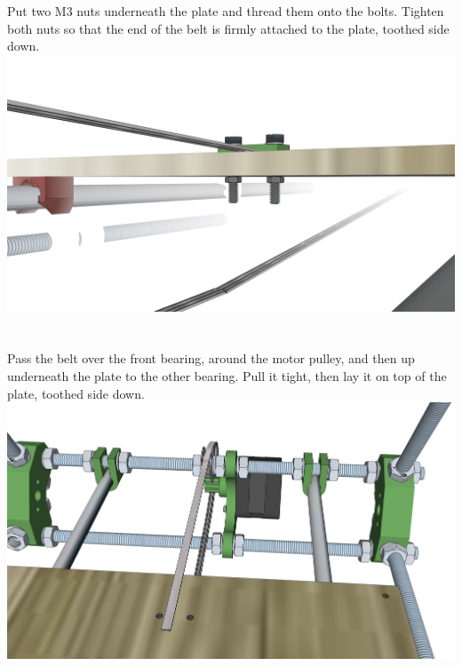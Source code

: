 \documentclass[twoside,a4paper,titlepage]{memoir}
\begin{document}
	\section{}
	Put two M3 nuts underneath the plate and thread them onto the bolts. Tighten both nuts so that the end
	of the belt is firmly attached to the plate, toothed side down.\\
	\includegraphics[width=1\linewidth]{graphics/ch6_25.png}
	
	\section{}
	Pass the belt over the front bearing, around the motor pulley, and then up underneath the plate to the
	other bearing. Pull it tight, then lay it on top of the plate, toothed side down.\\
	\includegraphics[width=1\linewidth]{graphics/ch6_26.png}
	
\end{document}
